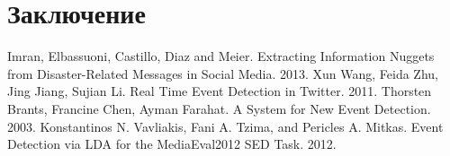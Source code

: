 \documentclass[12pt, a4paper]{article}
\begin{document}
  \section{Заключение}

\begin{thebibliography}{9}
	Imran, Elbassuoni, Castillo, Diaz and Meier.
	Extracting Information Nuggets from Disaster-Related Messages in Social Media.
	2013.
	Xun Wang, Feida Zhu, Jing Jiang, Sujian Li.
	Real Time Event Detection in Twitter.
	2011.
	Thorsten Brants, Francine Chen, Ayman Farahat.
	A System for New Event Detection.
	2003.
	Konstantinos N. Vavliakis, Fani A. Tzima, and Pericles A. Mitkas.	
	Event Detection via LDA for the MediaEval2012 SED Task.
	2012.
	
\end{thebibliography}
  
\end{document}
